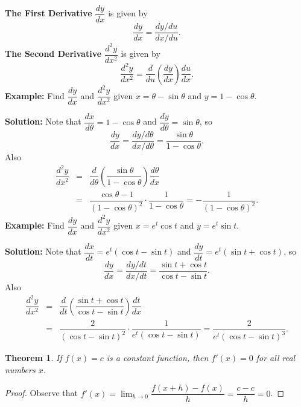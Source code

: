 \documentclass[titlepage,a4paper,12pt]{report}
\newtheorem{theorem}{Theorem}[section]
\begin{document}
\begin{enumerate}
\noindent \textbf{The First Derivative} $\dfrac{dy}{dx}$ is given by 
\begin{equation*}
\dfrac{dy}{dx} =\dfrac{dy/ du}{dx/ du}.
\end{equation*}
\textbf{The Second Derivative} $\dfrac{d^2y }{dx^2}$ is given by 
\begin{equation*}
\dfrac{d^2y}{dx^2} =\dfrac{d}{du}\left( \dfrac{dy}{dx}\right)\dfrac{du}{dx}.
\end{equation*}
\textbf{Example:} Find $\dfrac{dy}{dx}$ and $\dfrac{d^2y}{dx^2}$ given $x=\theta-\sin \theta$ and $y=1-\cos \theta$.

\noindent \textbf{Solution:} Note that $\dfrac{dx}{d\theta}=1-\cos \theta$ and $\dfrac{dy}{d\theta}=\sin \theta$, so 
\begin{equation*}
\dfrac{dy}{dx} =\dfrac{dy/ d\theta}{dx/ d\theta}=\dfrac{\sin \theta}{1-\cos \theta}.
\end{equation*}
Also \begin{eqnarray*}
\dfrac{d^2y}{dx^2} &=& \dfrac{d}{d\theta}\left( \dfrac{\sin \theta}{1-\cos \theta}\right)\dfrac{d\theta}{dx}\\
&=& \dfrac{\cos \theta -1}{(1-\cos \theta)^2}\cdot \dfrac{1}{1-\cos \theta} =-\dfrac{1}{(1-\cos \theta)^2}.
\end{eqnarray*}
\textbf{Example:} Find $\dfrac{dy}{dx}$ and $\dfrac{d^2y}{dx^2}$ given $x=e^t\cos t$ and $y=e^t\sin t$.

\noindent \textbf{Solution:} Note that $\dfrac{dx}{dt}=e^t(\cos t -\sin t)$ and $\dfrac{dy}{dt}=e^t(\sin t +\cos t)$, so 
\begin{equation*}
\dfrac{dy}{dx} =\dfrac{dy/ dt}{dx/ dt}=\dfrac{\sin t +\cos t}{\cos t -\sin t}.
\end{equation*}
Also 
\begin{eqnarray*}
\dfrac{d^2y}{dx^2} &=& \dfrac{d}{dt}\left(\dfrac{\sin t +\cos t}{\cos t -\sin t} \right)\dfrac{dt}{dx}\\
&=& \dfrac{2}{(\cos t - \sin t)^2} \cdot \dfrac{1}{e^t(\cos t -\sin t)} =\dfrac{2}{e^t(\cos t -\sin t)^3}.
\end{eqnarray*}
\end{enumerate}
\begin{theorem}
If $f(x)=c$ is a constant function, then $f'(x)=0$ for all real numbers $x$. 
\end{theorem}
\begin{proof}
Observe that $f'(x)=\displaystyle \lim _{h\rightarrow 0}\dfrac{f(x+h)-f(x)}{h}=\displaystyle \dfrac{c-c}{h}=0$.
\end{proof}
\end{document}
